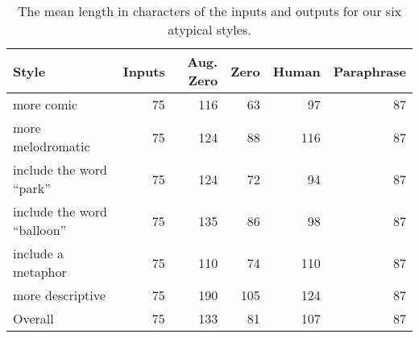 \begin{table*}[]
    \centering
    \small
    \begin{tabular}{l|r|rrrr}
    \toprule
    Style & Inputs & Aug. Zero & Zero & Human & Paraphrase \\
    \hline
        more comic &75&116&63&97&87\\
        more melodromatic &75&124&88&116&87 \\
        include the word ``park'' &75&124&72&94&87\\
        include the word ``balloon'' &75&135&86&98&87\\
        include a metaphor &75&110&74&110&87 \\
        more descriptive &75&190&105&124&87\\
        \hline
        Overall &75&133&81&107&87 \\
        \bottomrule
    \end{tabular}
    \caption{The mean length in characters of the inputs and outputs for our six atypical styles.}
    \label{tab:lengths}
\end{table*}